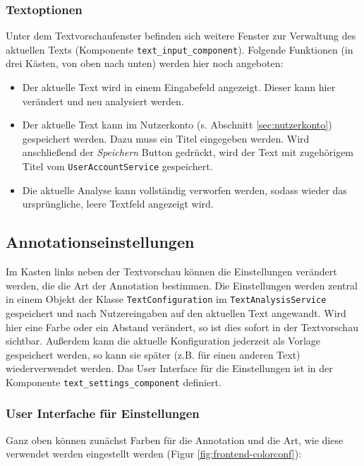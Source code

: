 \subsubsection{Textoptionen}

Unter dem Textvorschaufenster befinden sich weitere Fenster zur Verwaltung des aktuellen Texts (Komponente \texttt{text\_input\_component}). Folgende Funktionen (in drei Kästen, von oben nach unten) werden hier noch angeboten:
\begin{itemize}
	\item Der aktuelle Text wird in einem Eingabefeld angezeigt. Dieser kann hier verändert und neu analysiert werden.
	\item Der aktuelle Text kann im Nutzerkonto (s. Abschnitt \ref{sec:nutzerkonto}) gespeichert werden. Dazu muss ein Titel eingegeben werden. Wird anschließend der \textit{Speichern} Button gedrückt, wird der Text mit zugehörigem Titel vom \texttt{UserAccountService} gespeichert.
	\item Die aktuelle Analyse kann vollständig verworfen werden, sodass wieder das ursprüngliche, leere Textfeld angezeigt wird.
\end{itemize}

\subsection{Annotationseinstellungen}

Im Kasten links neben der Textvorschau können die Einstellungen verändert werden, die die Art der Annotation bestimmen. Die Einstellungen werden zentral in einem Objekt der Klasse \texttt{TextConfiguration} im \texttt{TextAnalysisService} gespeichert und nach Nutzereingaben auf den aktuellen Text angewandt. Wird hier eine Farbe oder ein Abstand verändert, so ist dies sofort in der Textvorschau sichtbar. Außerdem kann die aktuelle Konfiguration jederzeit als Vorlage gespeichert werden, so kann sie später (z.B. für einen anderen Text) wiederverwendet werden. Das User Interface für die Einstellungen ist in der Komponente \texttt{text\_settings\_component} definiert.

\subsubsection{User Interfache für Einstellungen}

Ganz oben können zunächst Farben für die Annotation und die Art, wie diese verwendet werden eingestellt werden (Figur \ref{fig:frontend-colorconf}):

